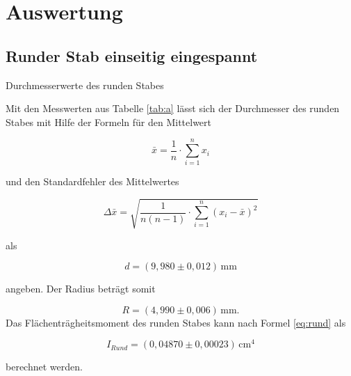 \section{Auswertung}
\label{sec:Auswertung}
\subsection{Runder Stab einseitig eingespannt}
\begin{table}[H]
  \centering
  
  
  \caption{Durchmesserwerte des runden Stabes}
  \label{tab:a}
\end{table}

Mit den Messwerten aus Tabelle \ref{tab:a} lässt sich
der Durchmesser des runden Stabes mit Hilfe der Formeln
für den Mittelwert

\begin{equation}
  \bar{x}=\frac{1}{n} \cdot \sum_{i=1}^n x_i
  \label{eq:a}
\end{equation}

\noindent und den Standardfehler des Mittelwertes

\begin{equation}
  \Delta\bar{x}=\sqrt{\frac{1}{n(n-1)}\cdot \sum_{i=1}^n(x_i-\bar{x})^2}
  \label{eq:b}
\end{equation}

\noindent als 

\begin{equation*}
  d=(9,980 \pm 0,012)\,\si{\milli\meter}
\end{equation*}

\noindent angeben. Der Radius beträgt somit

\begin{equation*}
  R=(4,990 \pm 0,006)\,\si{\milli\meter}.
\end{equation*}
\noindent Das Flächenträgheitsmoment des runden Stabes kann nach Formel \ref{eq:rund}
als

\begin{equation*}
  I_{Rund}=(0,04870 \pm 0,00023)\,\si{\centi\meter \tothe{4}}
\end{equation*}

\noindent berechnet werden. 


